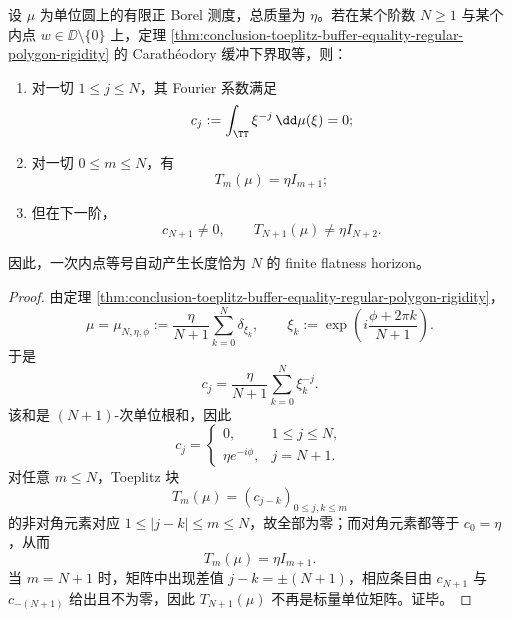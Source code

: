 \begin{theorem}\label{thm:conclusion-toeplitz-flat-horizon-from-one-inner-equality}
设 \(\mu\) 为单位圆上的有限正 Borel 测度，总质量为 \(\eta\)。若在某个阶数 \(N\ge 1\) 与某个内点 \(w\in \DD\setminus\{0\}\) 上，定理 \ref{thm:conclusion-toeplitz-buffer-equality-regular-polygon-rigidity} 的 Carath\'eodory 缓冲下界取等，则：
\begin{enumerate}
  \item 对一切 \(1\le j\le N\)，其 Fourier 系数满足
  \[
  c_j:=\int_{\TT}\xi^{-j}\,\dd \mu(\xi)=0;
  \]
  \item 对一切 \(0\le m\le N\)，有
  \[
  T_m(\mu)=\eta I_{m+1};
  \]
  \item 但在下一阶，
  \[
  c_{N+1}\neq 0,
  \qquad
  T_{N+1}(\mu)\neq \eta I_{N+2}.
  \]
\end{enumerate}
因此，一次内点等号自动产生长度恰为 \(N\) 的 finite flatness horizon。
\end{theorem}
\begin{proof}
由定理 \ref{thm:conclusion-toeplitz-buffer-equality-regular-polygon-rigidity}，
\[
\mu=\mu_{N,\eta,\phi}:=\frac{\eta}{N+1}\sum_{k=0}^{N}\delta_{\xi_k},
\qquad
\xi_k:=\exp\!\left(i\frac{\phi+2\pi k}{N+1}\right).
\]
于是
\[
c_j=\frac{\eta}{N+1}\sum_{k=0}^{N}\xi_k^{-j}.
\]
该和是 \((N+1)\)-次单位根和，因此
\[
c_j=
\begin{cases}
0,& 1\le j\le N,\\[2pt]
\eta e^{-i\phi},& j=N+1.
\end{cases}
\]
对任意 \(m\le N\)，Toeplitz 块
\[
T_m(\mu)=(c_{j-k})_{0\le j,k\le m}
\]
的非对角元素对应 \(1\le |j-k|\le m\le N\)，故全部为零；而对角元素都等于 \(c_0=\eta\)，从而
\[
T_m(\mu)=\eta I_{m+1}.
\]
当 \(m=N+1\) 时，矩阵中出现差值 \(j-k=\pm(N+1)\)，相应条目由 \(c_{N+1}\) 与 \(c_{-(N+1)}\) 给出且不为零，因此 \(T_{N+1}(\mu)\) 不再是标量单位矩阵。证毕。
\end{proof}

